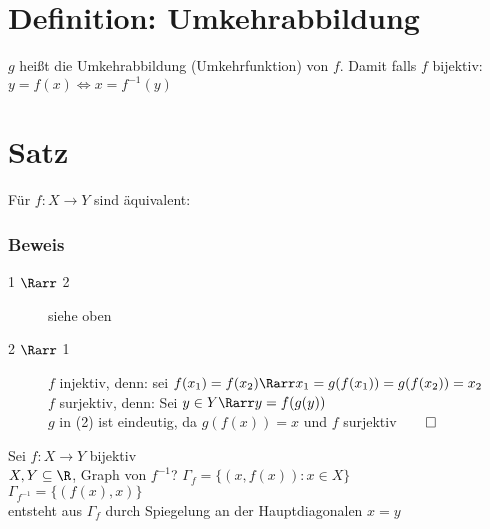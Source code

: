 \section{Definition: Umkehrabbildung}
$g$ heißt die Umkehrabbildung (Umkehrfunktion) von $f$. 
Damit falls $f$ bijektiv: $y = f(x) \Leftrightarrow x = f^{-1}(y)$
\section{Satz}
Für $f: X\to Y$ sind äquivalent:
\subsubsection*{Beweis}
\begin{description}
\item[1 $\Rarr$ 2] siehe oben
\item[2 $\Rarr$ 1] $f$ injektiv, denn: sei $f(x_1) = f(x_2) \Rarr x_1 = g(f(x_1)) = g(f(x_2)) = x_2$\\
$f$ surjektiv, denn: Sei $y \in Y \Rarr y = f(g(y))$\\
$g$ in (2) ist eindeutig, da $g(f(x)) = x$ und $f$ surjektiv$\qed$
\end{description}
Sei $f:X\to Y$ bijektiv\\
$X, Y \subseteq \R$, Graph von $f^{-1}$?
$\Gamma_f = \{(x, f(x)): x \in X\}$\\
$\Gamma_{f^{-1}} = \{(f(x), x)\}$\\
entsteht aus $\Gamma_f$ durch Spiegelung an der Hauptdiagonalen $x = y$\\
